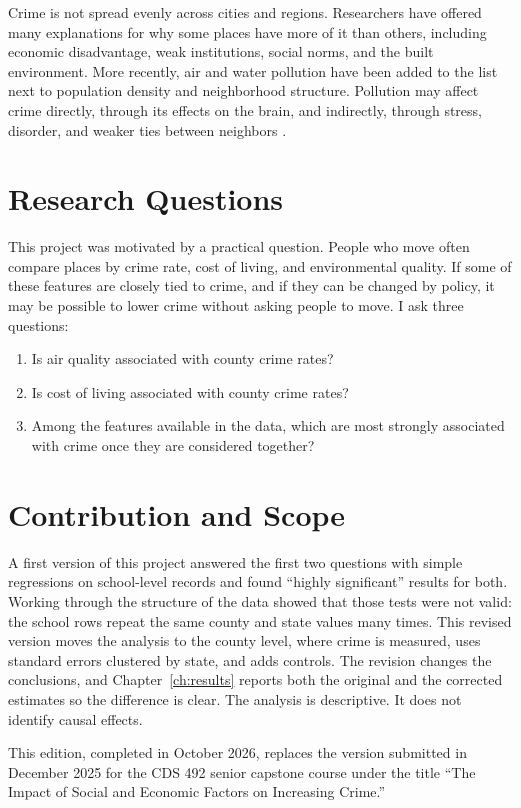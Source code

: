 \documentclass[12pt,letterpaper]{report}
\begin{document}
Crime is not spread evenly across cities and regions. Researchers have offered many
explanations for why some places have more of it than others, including economic
disadvantage, weak institutions, social norms, and the built environment. More recently,
air and water pollution have been added to the list next to population density and
neighborhood structure. Pollution may affect crime directly, through its effects on the
brain, and indirectly, through stress, disorder, and weaker ties between neighbors
\cite{glaeser1999,sampson1997,bondy2020,reyes2007,hanna2016}.

\section{Research Questions}
This project was motivated by a practical question. People who move often compare places
by crime rate, cost of living, and environmental quality. If some of these features are
closely tied to crime, and if they can be changed by policy, it may be possible to lower
crime without asking people to move. I ask three questions:
\begin{enumerate}
\item Is air quality associated with county crime rates?
\item Is cost of living associated with county crime rates?
\item Among the features available in the data, which are most strongly associated with
crime once they are considered together?
\end{enumerate}

\section{Contribution and Scope}
A first version of this project answered the first two questions with simple regressions on
school-level records and found ``highly significant'' results for both. Working through the
structure of the data showed that those tests were not valid: the school rows repeat the same
county and state values many times. This revised version moves the analysis to the county
level, where crime is measured, uses standard errors clustered by state, and adds controls.
The revision changes the conclusions, and Chapter~\ref{ch:results} reports both the
original and the corrected estimates so the difference is clear. The analysis is
descriptive. It does not identify causal effects.

This edition, completed in October 2026, replaces the version submitted in December 2025
for the CDS 492 senior capstone course under the title ``The Impact of Social and Economic Factors on Increasing Crime.''
\end{document}
